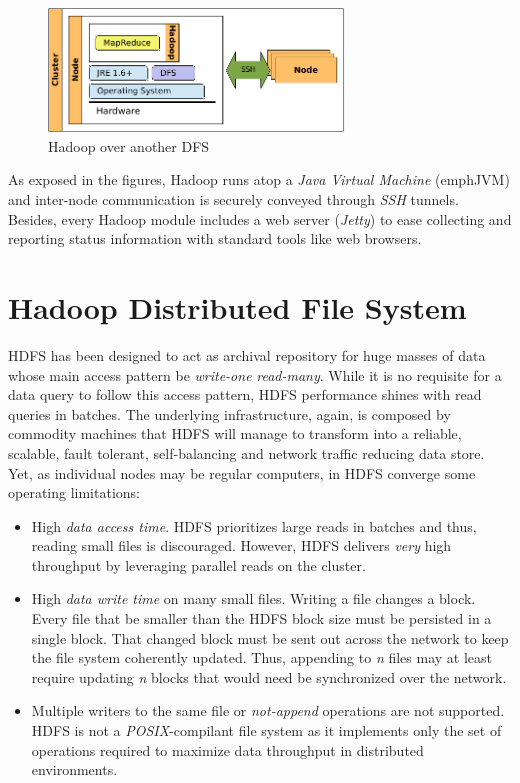 \begin{figure}[tbp]
\begin{center}
\includegraphics[width=0.7\textwidth]{imagenes/016.pdf}
 \caption{Hadoop over another DFS}
\label{fig:hadoopmapreddfs}
\end{center}
\end{figure}

As exposed in the figures, Hadoop runs atop a \emph{Java Virtual Machine} (emph{JVM}) and inter-node communication is securely conveyed through \emph{SSH} tunnels. Besides, every Hadoop module includes a web server (\emph{Jetty}) to ease collecting and reporting status information with standard tools like web browsers.

\section{Hadoop Distributed File System}\label{sec:hdfs}
\noindent HDFS has been designed to act as archival repository for huge masses of data whose main access pattern be \emph{write-one} \emph{read-many}. While it is no requisite for a data query to follow this access pattern, HDFS performance shines with read queries in batches. The underlying infrastructure, again, is composed by commodity machines that HDFS will manage to transform into a reliable, scalable, fault tolerant, self-balancing and network traffic reducing data store. Yet, as individual nodes may be regular computers, in HDFS converge some operating limitations:

\begin{itemize}
 \item High \emph{data access time}. HDFS prioritizes large reads in batches and thus, reading small files is  discouraged. However, HDFS delivers \emph{very} high throughput by leveraging parallel reads on the cluster.
 \item High \emph{data write time} on many small files. Writing a file changes a block. Every file that be smaller than the HDFS block size must be persisted in a single block. That changed block must be sent out across the network to keep the file system coherently updated. Thus, appending to \emph{n} files may at least require updating \emph{n} blocks that would need be synchronized over the network.
 \item Multiple writers to the same file or \emph{not-append} operations are not supported. HDFS is not a \emph{POSIX}-compilant file system as it implements only the set of operations required to maximize data throughput in distributed environments.
\end{itemize}

